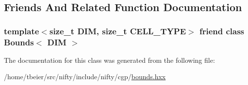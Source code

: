 \subsection{Friends And Related Function Documentation}
\hypertarget{classnifty_1_1cgp_1_1CellBoundsVector_a88cb0f4daae12ff33da3c2a17786cd08}{}
\subsubsection[{Bounds$<$ D\+I\+M $>$}]{\setlength{\rightskip}{0pt plus 5cm}template$<$size\+\_\+t D\+I\+M, size\+\_\+t C\+E\+L\+L\+\_\+\+T\+Y\+P\+E$>$ friend class {\bf Bounds}$<$ D\+I\+M $>$\hspace{0.3cm}{\ttfamily [friend]}}\label{classnifty_1_1cgp_1_1CellBoundsVector_a88cb0f4daae12ff33da3c2a17786cd08}


The documentation for this class was generated from the following file\+:\begin{DoxyCompactItemize}
\item 
/home/tbeier/src/nifty/include/nifty/cgp/\hyperlink{bounds_8hxx}{bounds.\+hxx}\end{DoxyCompactItemize}
